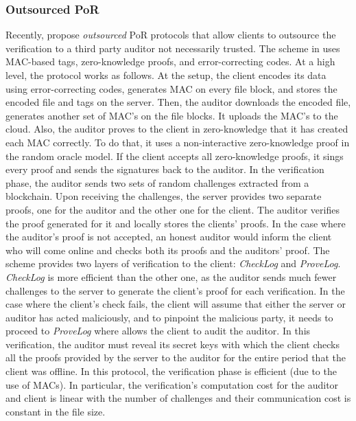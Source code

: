 \subsubsection {Outsourced PoR}\label{Outsourced-PoS}

Recently,  \cite{armknecht2014outsourced,xu2016lightweight} propose \emph{outsourced} PoR protocols that allow  clients to outsource the   verification to a third party auditor not necessarily  trusted. The scheme in \cite{armknecht2014outsourced} uses MAC-based tags, zero-knowledge proofs, and error-correcting codes. At a high level, the protocol works as follows. At the setup,   the client  encodes its data using error-correcting codes, generates MAC on every file block, and stores the encoded file and tags on the server.  Then, the auditor downloads the encoded file, generates another set of MAC's on the file blocks. It uploads the MAC's to the cloud. Also, the auditor proves to the client in zero-knowledge that it has created each MAC correctly. To do that, it uses a non-interactive zero-knowledge proof in the random oracle model. If the client accepts all zero-knowledge proofs, it sings every proof and sends the signatures back to the auditor. In the verification phase, the auditor sends two sets of random challenges extracted from a blockchain. Upon receiving the challenges, the server provides two separate proofs, one for the auditor and the other one for the client. The auditor verifies the proof generated for it and  locally stores the clients' proofs. In the case where the auditor's proof is not accepted, an honest auditor would inform the client who will come online and checks both its proofs and the auditors' proof. The scheme provides two layers of verification to the client: \textit{CheckLog} and \textit{ProveLog}.  \textit{CheckLog}  is more efficient than the other one, as the auditor sends  much fewer challenges to the server to generate the client's proof for each verification. In the case where the client's check fails, the client will assume that either the server or auditor has acted maliciously, and to pinpoint the malicious party, it needs to proceed to \textit{ProveLog} where allows the client to audit the auditor. In this verification, the auditor must reveal its secret keys with which the client checks all the proofs provided by the server to the auditor for the entire period that the client was offline. In this protocol, the verification phase is efficient (due to the use of MACs). In particular, the verification's computation cost for the auditor and client is linear with the number of challenges and their communication cost is constant in the file size.  

